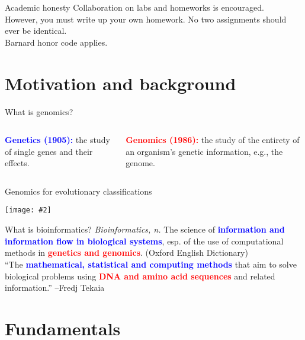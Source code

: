 \documentclass{beamer}
\renewcommand{\c}[1]{\begin{center}#1\end{center}}
\newcommand{\blu}[1]{\textcolor{blue}{\textbf{#1}}}
\newcommand{\red}[1]{\textcolor{red}{\textbf{#1}}}
\newcommand{\gr}[2][.95]{\c{\texttt{[image: \#2]}}}
\begin{document}
\begin{frame}{Academic honesty}
Collaboration on labs and homeworks is encouraged.\\
\bigskip
However, you must write up your own homework. No two assignments should ever be identical.\\
\bigskip
Barnard honor code applies.
\end{frame}

\section{Motivation and background}


\begin{frame}{What is genomics?}
\begin{columns}[t]
\begin{column}{0.5\textwidth}
    \blu{Genetics (1905):} the study of single genes and their effects.
    \fbox{\gr{l1_figs/s3_tree.png}}
    \end{column}
\begin{column}{0.5\textwidth}
    \red{Genomics (1986):} the study of the entirety of an organism's genetic information, e.g., the genome.
    \fbox{\gr{l1_figs/s3_genome.png}}
    \end{column}
\end{columns}
\end{frame}

\begin{frame}{Genomics for evolutionary classifications}
\gr{l1_figs/s4_related.png}
\end{frame}

\begin{frame}{What is bioinformatics?}
\textit{Bioinformatics, n.} The science of \blu{information and information flow in biological systems}, esp. of the use of computational methods in \red{genetics and genomics}. (Oxford English Dictionary)\\
\bigskip
``The \blu{mathematical, statistical and computing methods} that aim to solve biological problems using \red{DNA and amino acid sequences} and related information.'' --Fredj Tekaia
\end{frame}

\section{Fundamentals}
\end{document}
